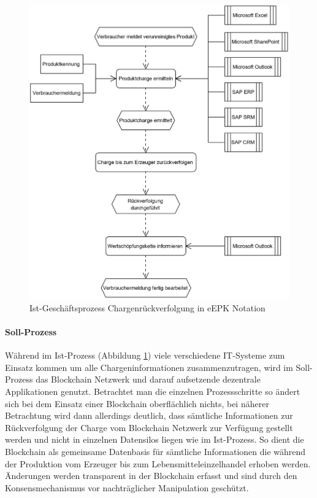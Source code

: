 \begin{figure}[H]
	\centering
	\includegraphics[width=1\linewidth]{pictures/business-process-source-epc-diagram-bw}
	\caption[Ist-Geschäftsprozess Chargenrückverfolgung]{Ist-Geschäftsprozess Chargenrückverfolgung in eEPK Notation}
	\label{fig:business-process-epc-diagramm}
\end{figure}

\paragraph{Soll-Prozess}
Während im Ist-Prozess (Abbildung \ref{fig:business-process-epc-diagramm}) viele verschiedene IT-Sys\-teme zum Einsatz kommen um alle Chargeninformationen zusammenzutragen, wird im Soll-Prozess das Blockchain Netzwerk und darauf aufsetzende dezentrale Applikationen genutzt. Betrachtet man die einzelnen Prozessschritte so ändert sich bei dem Einsatz einer Blockchain oberflächlich nichts, bei näherer Betrachtung wird dann allerdings deutlich, dass sämtliche Informationen zur Rückverfolgung der Charge vom Blockchain Netzwerk zur Verfügung gestellt werden und nicht in einzelnen Datensilos liegen wie im Ist-Prozess. So dient die Blockchain als gemeinsame Datenbasis für sämtliche Informationen die während der Produktion vom Erzeuger bis zum Lebensmitteleinzelhandel erhoben werden. Änderungen werden transparent in der Blockchain erfasst und sind durch den Konsensmechanismus vor nachträglicher Manipulation geschützt. 

